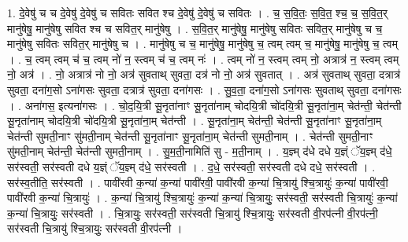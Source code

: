 \documentclass[17pt]{extarticle}
\begin{document}
1. दे॒वेषु॑ च च दे॒वेषु॑ दे॒वेषु॑ च सवितः सवित श्च दे॒वेषु॑ दे॒वेषु॑ च सवितः । . च॒ स॒वि॒तः॒ स॒वि॒त॒ श्च॒ च॒ स॒वि॒त॒र् मानु॑षेषु॒ मानु॑षेषु सवित श्च च सवित॒र् मानु॑षेषु । . स॒वि॒त॒र् मानु॑षेषु॒ मानु॑षेषु सवितः सवित॒र् मानु॑षेषु च च॒ मानु॑षेषु सवितः सवित॒र् मानु॑षेषु च । . मानु॑षेषु च च॒ मानु॑षेषु॒ मानु॑षेषु च॒ त्वम् त्वम् च॒ मानु॑षेषु॒ मानु॑षेषु च॒ त्वम् । . च॒ त्वम् त्वम् च॑ च॒ त्वम् नो॑ न॒ स्त्वम् च॑ च॒ त्वम् नः॑ । . त्वम् नो॑ न॒ स्त्वम् त्वम् नो॒ अत्रात्र॑ न॒ स्त्वम् त्वम् नो॒ अत्र॑ । . नो॒ अत्रात्र॑ नो नो॒ अत्र॑ सुवताथ् सुवता॒ दत्र॑ नो नो॒ अत्र॑ सुवतात् । . अत्र॑ सुवताथ् सुवता॒ दत्रात्र॑ सुवता॒ दना॑ग॒सो ऽना॑गसः सुवता॒ दत्रात्र॑ सुवता॒ दना॑गसः । . सु॒व॒ता॒ दना॑ग॒सो ऽना॑गसः सुवताथ् सुवता॒ दना॑गसः । . अना॑गस॒ इत्यना॑गसः । . चो॒द॒यि॒त्री सू॒नृता॑नाꣳ सू॒नृता॑नाम् चोदयि॒त्री चो॑दयि॒त्री सू॒नृता॑ना॒म् चेत॑न्ती॒ चेत॑न्ती सू॒नृता॑नाम् चोदयि॒त्री चो॑दयि॒त्री सू॒नृता॑ना॒म् चेत॑न्ती । . सू॒नृता॑ना॒म् चेत॑न्ती॒ चेत॑न्ती सू॒नृता॑नाꣳ सू॒नृता॑ना॒म् चेत॑न्ती सुमती॒नाꣳ सु॑मती॒नाम् चेत॑न्ती सू॒नृता॑नाꣳ सू॒नृता॑ना॒म् चेत॑न्ती सुमती॒नाम् । . चेत॑न्ती सुमती॒नाꣳ सु॑मती॒नाम् चेत॑न्ती॒ चेत॑न्ती सुमती॒नाम् । . सु॒म॒ती॒नामिति॑ सु - म॒ती॒नाम् । . य॒ज्ञ्म् द॑धे दधे य॒ज्ञ्ं ॅय॒ज्ञ्म् द॑धे॒ सर॑स्वती॒ सर॑स्वती दधे य॒ज्ञ्ं ॅय॒ज्ञ्म् द॑धे॒ सर॑स्वती । . द॒धे॒ सर॑स्वती॒ सर॑स्वती दधे दधे॒ सर॑स्वती । . सर॑स्व॒तीति॒ सर॑स्वती । . पावी॑रवी क॒न्या॑ क॒न्या॑ पावी॑रवी॒ पावी॑रवी क॒न्या॑ चि॒त्रायु॑ श्चि॒त्रायुः॑ क॒न्या॑ पावी॑रवी॒ पावी॑रवी क॒न्या॑ चि॒त्रायुः॑ । . क॒न्या॑ चि॒त्रायु॑ श्चि॒त्रायुः॑ क॒न्या॑ क॒न्या॑ चि॒त्रायुः॒ सर॑स्वती॒ सर॑स्वती चि॒त्रायुः॑ क॒न्या॑ क॒न्या॑ 
चि॒त्रायुः॒ सर॑स्वती । . चि॒त्रायुः॒ सर॑स्वती॒ सर॑स्वती चि॒त्रायु॑ श्चि॒त्रायुः॒ सर॑स्वती वी॒रप॑त्नी वी॒रप॑त्नी॒ सर॑स्वती चि॒त्रायु॑ श्चि॒त्रायुः॒ सर॑स्वती वी॒रप॑त्नी । \newline
\end{document}
